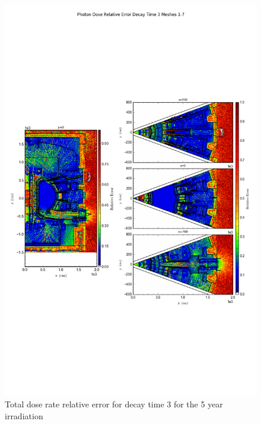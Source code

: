 \documentclass[12pt]{article}
\begin{document}
\begin{figure}[ht!]
\centering
\includegraphics[trim={0cm 8cm, 0cm 8cm},clip,scale=0.75]{../plots/final_model_with_b4c/5year/Photon_Dose_Relative_Error_Decay_Time_3_Meshes_1-7.png}
\caption{Total dose rate relative error for decay time 3 for the 5 year irradiation}
\label{fig:photons_5y_dc3_nob4c_relerr}
\end{figure}
\clearpage
\newpage
\end{document}
